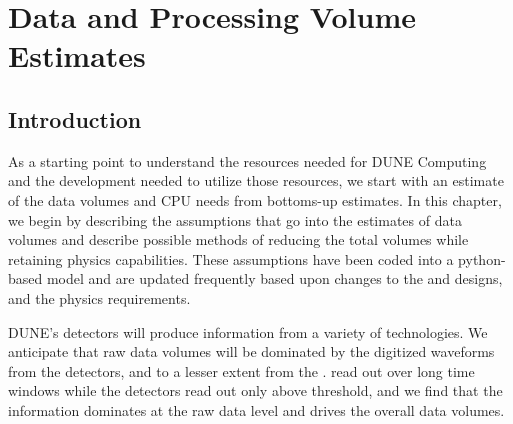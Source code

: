 \documentclass[../main-v1.tex]{subfiles}
\begin{document}

\chapter{Data and Processing Volume Estimates }

\label{ch:est}
 


\section{Introduction }%
As a starting point to understand the resources needed for DUNE Computing and the development needed to utilize those resources, we start with an estimate of the data volumes and CPU needs from bottoms-up estimates. 
In this chapter, we begin by describing the assumptions that go into the estimates of data volumes and describe possible methods of reducing the total volumes while retaining physics capabilities. 
These assumptions have been coded into a python-based model and are updated frequently based upon changes to the  and  designs, and the physics requirements.



DUNE's detectors will produce information from a variety of technologies.  We anticipate that raw data volumes will be dominated by the digitized waveforms from the  detectors, and to a lesser extent from the .  read out over long time windows while the  detectors read out only above threshold, and we find that the  information dominates at the raw data level and drives the overall data volumes. %
\end{document}
